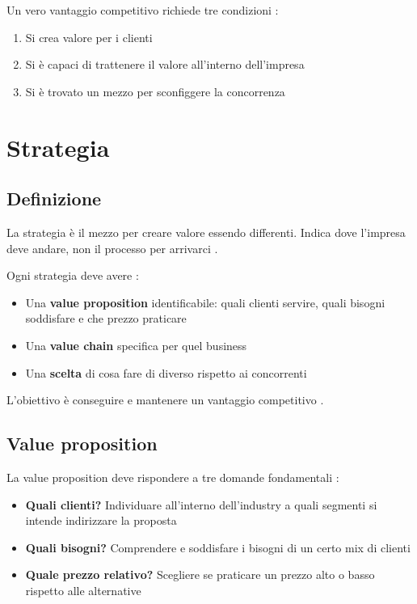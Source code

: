 \documentclass[12pt,a4paper]{article}
\begin{document}
Un vero vantaggio competitivo richiede tre condizioni :
\begin{enumerate}
    \item Si crea valore per i clienti
    \item Si è capaci di trattenere il valore all'interno dell'impresa
    \item Si è trovato un mezzo per sconfiggere la concorrenza
\end{enumerate}

\section{Strategia}

\subsection{Definizione}
La strategia è il mezzo per creare valore essendo differenti. Indica dove l'impresa deve andare, non il processo per arrivarci .

Ogni strategia deve avere :
\begin{itemize}
    \item Una \textbf{value proposition} identificabile: quali clienti servire, quali bisogni soddisfare e che prezzo praticare
    \item Una \textbf{value chain} specifica per quel business
    \item Una \textbf{scelta} di cosa fare di diverso rispetto ai concorrenti
\end{itemize}

L'obiettivo è conseguire e mantenere un vantaggio competitivo .

\subsection{Value proposition}
La value proposition deve rispondere a tre domande fondamentali :

\begin{itemize}
    \item \textbf{Quali clienti?} Individuare all'interno dell'industry a quali segmenti si intende indirizzare la proposta
    \item \textbf{Quali bisogni?} Comprendere e soddisfare i bisogni di un certo mix di clienti
    \item \textbf{Quale prezzo relativo?} Scegliere se praticare un prezzo alto o basso rispetto alle alternative
\end{itemize}
\end{document}
